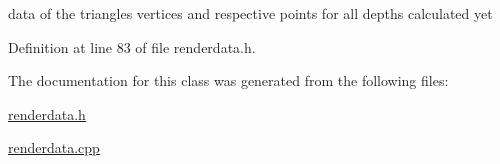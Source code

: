 data of the triangles\textquotesingle{} vertices and respective points for all depths calculated yet 



Definition at line 83 of file renderdata.\+h.



The documentation for this class was generated from the following files\+:\begin{DoxyCompactItemize}
\item 
\hyperlink{renderdata_8h}{renderdata.\+h}\item 
\hyperlink{renderdata_8cpp}{renderdata.\+cpp}\end{DoxyCompactItemize}
